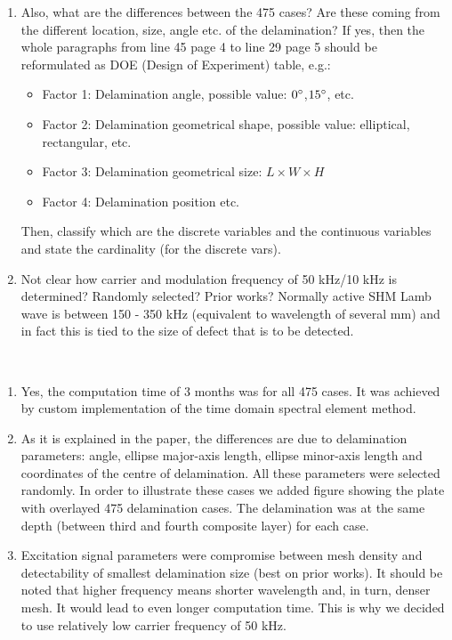 \documentclass[11pt,a4paper]{article}
\begin{document}
{{\begin{enumerate}
			\item Also, what are the differences between the 475 cases? Are these coming from the different location, size, angle etc. of the delamination? If yes, then the whole paragraphs from line 45 page 4 to line 29 page 5 should be reformulated as DOE (Design of Experiment) table, e.g.:
			\begin{itemize}
				\item Factor 1: Delamination angle, possible value: \(0\degree\),\(15\degree\), etc.
				\item Factor 2: Delamination geometrical shape, possible value: elliptical, rectangular, etc.
				\item Factor 3: Delamination geometrical size: \(L \times W \times H\)
				\item Factor 4: Delamination position etc.	
			\end{itemize}
			Then, classify which are the discrete variables and the continuous variables and state the cardinality (for the discrete vars).
			\item Not clear how carrier and modulation frequency of 50 kHz/10 kHz is determined? Randomly selected? Prior works? Normally active SHM Lamb wave is between 150 - 350 kHz (equivalent to wavelength of several mm) and in fact this is tied to the size of defect that is to be detected.
			\\ 
			
	\end{enumerate}
	\\
	\begin{enumerate}
	\item Yes, the computation time of 3 months was for all 475 cases. It was achieved by custom implementation of the time domain spectral element method.
	
	\item As it is explained in the paper, the differences are due to delamination parameters: angle, ellipse major-axis length, ellipse minor-axis length and coordinates of the centre of delamination. All these parameters were selected randomly. In order to illustrate these cases we added figure showing the plate with overlayed 475 delamination cases. The delamination was at the same depth (between third and fourth composite layer) for each case.
	
	\item Excitation signal parameters were compromise between mesh density and detectability of smallest delamination size (best on prior works). It should be noted that higher frequency means shorter wavelength and, in turn, denser mesh. It would lead to even longer computation time. This is why we decided to use relatively low carrier frequency of 50 kHz.
	\end{enumerate}
		
}}
\end{document}
